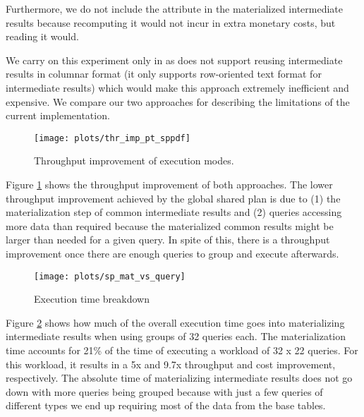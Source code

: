 Furthermore, we do not include the \qset attribute
in the materialized intermediate results
because recomputing it would not incur in extra monetary costs, but reading it would.

We carry on this experiment only
in \bigquery as \athena does not support reusing intermediate results in
columnar format (it only supports row-oriented text format for intermediate
results) which would make this approach extremely inefficient and expensive.
We compare our two approaches for describing the limitations of the current
implementation.


\begin{figure}[b]
    \centering
        \texttt{[image: plots/thr\_imp\_pt\_sppdf]}
        \caption{Throughput improvement of execution modes.}
        \label{fig:exp:th_imp_over_qat}
\end{figure}

Figure \ref{fig:exp:th_imp_over_qat} shows the throughput improvement of both
approaches.  The lower throughput improvement achieved by the global shared plan
is due to (1) the materialization step of common intermediate results and (2)
queries accessing more data than required because the materialized common
results might be larger than needed for a given query.  In spite of this, there
is a throughput improvement once there are enough queries to group and execute
afterwards.  

\begin{figure}[!hb]
    \centering
        \texttt{[image: plots/sp\_mat\_vs\_query]}
        \caption{Execution time breakdown}
        \label{fig:exp:exec_time_breakdown}
\end{figure}

Figure \ref{fig:exp:exec_time_breakdown} shows how much of the overall execution
time goes into materializing intermediate results when using groups of 32
queries each. The materialization time accounts for 21\% of the time of
executing a workload of 32 x 22 queries. For this workload, it results in a 5x
and 9.7x throughput and cost improvement, respectively. The absolute time of
materializing intermediate results does not go down with more queries being
grouped because with just a few queries of different types we end up requiring
most of the data from the base tables.


